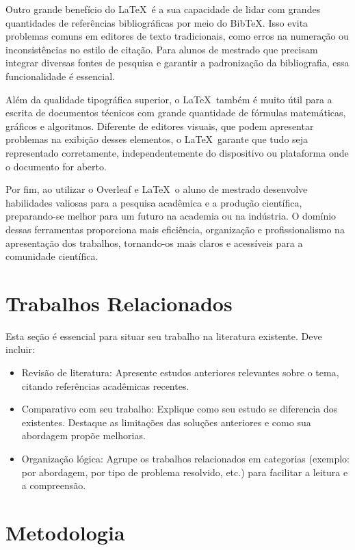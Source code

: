 Outro grande benefício do \LaTeX\ é a sua capacidade de lidar com grandes quantidades de referências bibliográficas por meio do BibTeX. Isso evita problemas comuns em editores de texto tradicionais, como erros na numeração ou inconsistências no estilo de citação. Para alunos de mestrado que precisam integrar diversas fontes de pesquisa e garantir a padronização da bibliografia, essa funcionalidade é essencial.  

Além da qualidade tipográfica superior, o \LaTeX\ também é muito útil para a escrita de documentos técnicos com grande quantidade de fórmulas matemáticas, gráficos e algoritmos. Diferente de editores visuais, que podem apresentar problemas na exibição desses elementos, o \LaTeX\ garante que tudo seja representado corretamente, independentemente do dispositivo ou plataforma onde o documento for aberto.  

Por fim, ao utilizar o Overleaf e \LaTeX\, o aluno de mestrado desenvolve habilidades valiosas para a pesquisa acadêmica e a produção científica, preparando-se melhor para um futuro na academia ou na indústria. O domínio dessas ferramentas proporciona mais eficiência, organização e profissionalismo na apresentação dos trabalhos, tornando-os mais claros e acessíveis para a comunidade científica.

\section{Trabalhos Relacionados}
Esta seção é essencial para situar seu trabalho na literatura existente. Deve incluir:
\begin{itemize}
    \item Revisão de literatura: Apresente estudos anteriores relevantes sobre o tema, citando referências acadêmicas recentes.

    \item Comparativo com seu trabalho: Explique como seu estudo se diferencia dos existentes. Destaque as limitações das soluções anteriores e como sua abordagem propõe melhorias.

    \item Organização lógica: Agrupe os trabalhos relacionados em categorias (exemplo: por abordagem, por tipo de problema resolvido, etc.) para facilitar a leitura e a compreensão.

\end{itemize}

\section{Metodologia}

